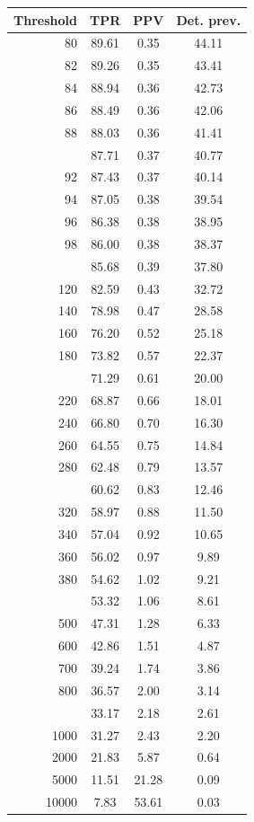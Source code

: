 \documentclass[12pt]{article}
\begin{document}
\begin{minipage}{0.5\textwidth}\small
\begin{tabular}{rccc}
\toprule
\textbf{Threshold} & \textbf{TPR} 
& \textbf{PPV} & \textbf{Det. prev.} \\
\midrule
     80 & 89.61 & 0.35 & 44.11 \\ 
     82 & 89.26 & 0.35 & 43.41 \\ 
     84 & 88.94 & 0.36 & 42.73 \\ 
     86 & 88.49 & 0.36 & 42.06 \\ 
     88 & 88.03 & 0.36 & 41.41 \\ \addlinespace
     90 & 87.71 & 0.37 & 40.77 \\ 
     92 & 87.43 & 0.37 & 40.14 \\ 
     94 & 87.05 & 0.38 & 39.54 \\ 
     96 & 86.38 & 0.38 & 38.95 \\ 
     98 & 86.00 & 0.38 & 38.37 \\ \addlinespace
    100 & 85.68 & 0.39 & 37.80 \\ 
    120 & 82.59 & 0.43 & 32.72 \\ 
    140 & 78.98 & 0.47 & 28.58 \\ 
    160 & 76.20 & 0.52 & 25.18 \\ 
    180 & 73.82 & 0.57 & 22.37 \\  \addlinespace
	200 & 71.29 & 0.61 & 20.00 \\ 
    220 & 68.87 & 0.66 & 18.01 \\ 
    240 & 66.80 & 0.70 & 16.30 \\ 
    260 & 64.55 & 0.75 & 14.84 \\ 
    280 & 62.48 & 0.79 & 13.57 \\   \addlinespace
    300 & 60.62 & 0.83 & 12.46 \\ 
    320 & 58.97 & 0.88 & 11.50 \\ 
    340 & 57.04 & 0.92 & 10.65 \\ 
    360 & 56.02 & 0.97 & 9.89 \\ 
    380 & 54.62 & 1.02 & 9.21 \\   \addlinespace
    400 & 53.32 & 1.06 & 8.61 \\ 
    500 & 47.31 & 1.28 & 6.33 \\ 
    600 & 42.86 & 1.51 & 4.87 \\ 
    700 & 39.24 & 1.74 & 3.86 \\ 
    800 & 36.57 & 2.00 & 3.14 \\    \addlinespace
    900 & 33.17 & 2.18 & 2.61 \\ 
   1000 & 31.27 & 2.43 & 2.20 \\ 
   2000 & 21.83 & 5.87 & 0.64 \\
   5000 & 11.51 & 21.28 & 0.09 \\ 
   10000 & 7.83 & 53.61 & 0.03 \\ 
\bottomrule
\end{tabular}

\end{minipage}
\end{document}

